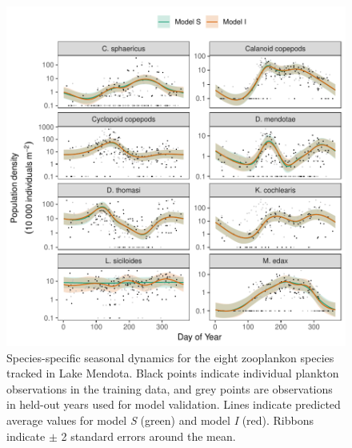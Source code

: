 \documentclass[12pt]{article}
\begin{document}
\begin{figure}
\centering
\includegraphics{../figures/zoo_comm_plot-1.pdf}
\caption{\label{fig:zoo_comp}Species-specific seasonal dynamics for the
eight zooplankon species tracked in Lake Mendota. Black points indicate
individual plankton observations in the training data, and grey points
are observations in held-out years used for model validation. Lines
indicate predicted average values for model \emph{S} (green) and model
\emph{I} (red). Ribbons indicate \(\pm\) 2 standard errors around the
mean.}
\end{figure}
\end{document}
